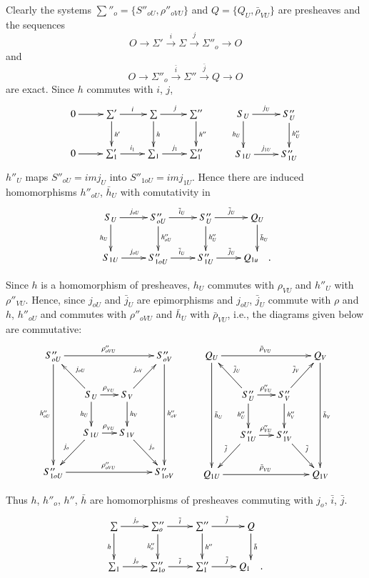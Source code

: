 Clearly the systems $\sum''_o= \{ S''_{oU}, \rho''_{oVU} \}$ and $Q=\{
Q_U, \bar{\rho}_{VU} \}$ are presheaves and the sequences 
$$
O \to \Sigma' \xrightarrow{i} \Sigma\xrightarrow{j} \Sigma''_o\to O
$$
and
$$
O \to \Sigma''_o \xrightarrow{\bar{i}} \Sigma''\xrightarrow{\bar{j}} Q \to O
$$
are exact. Since $h$ commutes with $i$, $j$,
\[
\xymatrix{
0\ar[r] & \sum'\ar[r]^i\ar[d]^{h'} & \sum\ar[r]^j\ar[d]^h &
\sum''\ar[d]^{h''}\\
0 \ar[r] & \sum'_1 \ar[r]^{i_1}& \sum_1 \ar[r]^{j_1} & \sum''_1
}
\qquad 
\xymatrix{
S_U\ar[r]^{j_U}\ar[d]_{h_U} & S''_U\ar[d]^{h''_U} \\
S_{1U} \ar[r]^{j_{1U}} & S''_{1U}
}
\]\pageoriginale
$h''_U $ maps $S''_{oU} = im j_U$ into $S''_{1oU} = im j_{1U}$. Hence there
are induced homomorphisms $h''_{oU}$, $\bar{h}_U$ with comutativity in 
\[
\xymatrix{
S_U \ar[r]^{j_{oU}} \ar[d]_{h_U} & S''_{oU} \ar[r]^{\bar{i}_U}
\ar[d]^{h''_{oU}} & S''_U\ar[r]^{\bar{j}_U} \ar[d]^{h''_U}&
Q_U\ar[d]^{\bar{h}_U}\\
S_{1U} \ar[r]^{j_{oU}} & S''_{1oU} \ar[r]^{\bar{i}_U} &
S''_{1U}\ar[r]^{\bar{j}_U} & Q_{1u} \quad .
}
\]

Since $h$ is a homomorphism of presheaves, $h_U$ commutes with
$\rho_{VU}$ and $h''_U$ with $\rho''_{VU}$. Hence, since $j_{oU}$ and 
$\bar{j}_U$ are epimorphisms and $j_{oU}$, $\bar{j}_U$ commute with $\rho$
and $h$, $h''_{oU}$ and commutes with $\rho''_{oVU}$ and $\bar{h}_U$ with
$\bar{\rho}_{VU}$, i.e., the diagrams given below are commutative: 
{\fontsize{9}{11}\selectfont
\[
\xymatrix@C=0.5cm{
S''_{oU}\ar[rrr]^{\rho''_{oVU}}\ar[ddd]_{h''_{oU}} & & &
S''_{oV}\ar[ddd]^{h''_{oV}}\\
& S_U\ar[r]^{\rho_{_{VU}}}\ar[d]_{h_U} \ar[ul]_{j_{oU}} & S_V \ar[d]^{h_V}
\ar[ur]^{j_{oV}} & \\
& S_{1U} \ar[r]^{\rho_{_{VU}}} \ar[dl]_{j_o} & S_{1V} \ar[dr]^{j_o} & \\
S''_{1oU} \ar[rrr]^{\rho''_{oVU}} & & & S''_{1oV}
}
\qquad
\xymatrix@C=0.5cm{
Q_U \ar[rrr]^{\bar{\rho}_{_{VU}}}\ar[ddd]^{\bar{h}_{U}} & & &
Q_{V}\ar[ddd]^{\bar{h}_{V}}\\
& S''_U\ar[r]^{\rho''_{VU}}\ar[d]_{h''_U} \ar[ul]_{\bar{j}_{U}} &
S''_V \ar[d]^{h''_V} \ar[ur]^{\bar{j}_{V}} & \\
& S''_{1U} \ar[r]^{\rho''_{VU}} \ar[dl]_{\bar{j}} & S''_{1V}
\ar[dr]^{\bar{j}} & \\ 
Q_{1U} \ar[rrr]^{\bar{\rho}_{_{VU}}} & & & Q_{1V}
}
\]}\relax


Thus $h$, $h''_o$, $h''$, $\bar{h}$ are homomorphisms of presheaves
commuting with $j_o$, $\bar{i}$, $\bar{j}$.  
\[
\xymatrix{
\sum\ar[r]^{j_o}\ar[d]_h  & \sum''_o \ar[r]^{\bar{i}}\ar[d]_{h''_o} &
\sum''\ar[r]^{\bar{j}} \ar[d]^{h''} & Q \ar[d]^{\bar{h}}\\
\sum_1 \ar[r]^{j_o} & \sum''_{1o} \ar[r]^{\bar{i}} & \sum''_1
\ar[r]^{\bar{j}} & Q_1 \quad .
}
\]

